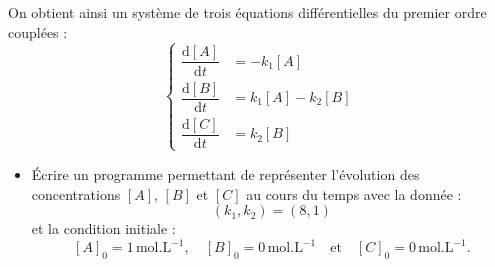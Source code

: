 \documentclass[11pt]{article}
\begin{document}
On obtient ainsi un système de trois équations différentielles du premier ordre couplées : 
\[ \left\{ \begin{aligned} \dfrac{\text{d}[A]}{\text{d}t}&=-k_1[A] \\
	\dfrac{\text{d}[B]}{\text{d}t}&=k_1[A]-k_2[B] \\
	\dfrac{\text{d}[C]}{\text{d}t}&=k_2[B] \end{aligned} \right. \]

\begin{itemize}
	\item[\textbullet] \'{E}crire un programme permettant de représenter l'évolution des concentrations $[A]$, $[B]$ et $[C]$ au cours du temps avec la donnée :
		\[ (k_1,k_2)=(8,1) \]
		et la condition initiale :
		\[ [A]_0=1\,\text{mol}.\text{L}^{-1}, \quad [B]_0=0\,\text{mol}.\text{L}^{-1} \quad \text{et} \quad [C]_0=0\,\text{mol}.\text{L}^{-1}. \]
\end{itemize}
\end{document}
